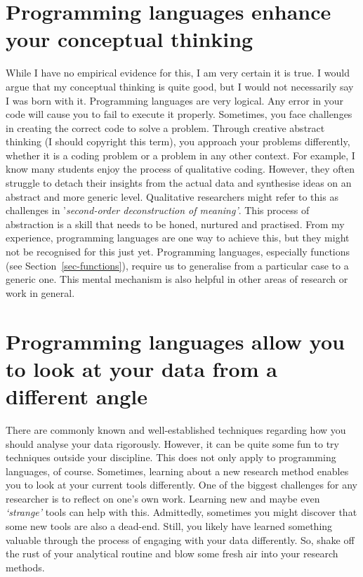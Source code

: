 \documentclass[
  letterpaper,
]{krantz}
\begin{document}
\section{Programming languages enhance your conceptual
thinking}\label{sec-programming-languages-enhance-your-conceptual-thinking}

While I have no empirical evidence for this, I am very certain it is
true. I would argue that my conceptual thinking is quite good, but I
would not necessarily say I was born with it. Programming languages are
very logical. Any error in your code will cause you to fail to execute
it properly. Sometimes, you face challenges in creating the correct code
to solve a problem. Through creative abstract thinking (I should
copyright this term), you approach your problems differently, whether it
is a coding problem or a problem in any other context. For example, I
know many students enjoy the process of qualitative coding. However,
they often struggle to detach their insights from the actual data and
synthesise ideas on an abstract and more generic level. Qualitative
researchers might refer to this as challenges in '\emph{second-order
deconstruction of meaning'}. This process of abstraction is a skill that
needs to be honed, nurtured and practised. From my experience,
programming languages are one way to achieve this, but they might not be
recognised for this just yet. Programming languages, especially
functions (see Section~\ref{sec-functions}), require us to generalise
from a particular case to a generic one. This mental mechanism is also
helpful in other areas of research or work in general.

\section{Programming languages allow you to look at your data from a
different
angle}\label{sec-programming-languages-allow-you-to-look-at-your-data-from-a-different-angle}

There are commonly known and well-established techniques regarding how
you should analyse your data rigorously. However, it can be quite some
fun to try techniques outside your discipline. This does not only apply
to programming languages, of course. Sometimes, learning about a new
research method enables you to look at your current tools differently.
One of the biggest challenges for any researcher is to reflect on one's
own work. Learning new and maybe even \emph{`strange'} tools can help
with this. Admittedly, sometimes you might discover that some new tools
are also a dead-end. Still, you likely have learned something valuable
through the process of engaging with your data differently. So, shake
off the rust of your analytical routine and blow some fresh air into
your research methods.
\end{document}
